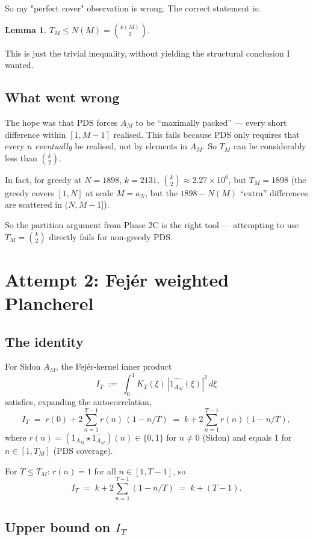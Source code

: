 \documentclass[11pt]{article}
\newtheorem{lemma}{Lemma}
\begin{document}
So my "perfect cover" observation is wrong. The correct statement is:

\begin{lemma}\label{lem:Tlow}
$T_M \leq N(M) = \binom{k(M)}{2}$.
\end{lemma}

This is just the trivial inequality, without yielding the structural
conclusion I wanted.

\subsection{What went wrong}

The hope was that PDS forces $A_M$ to be ``maximally packed'' --- every
short difference within $[1, M-1]$ realised. This fails because PDS only
requires that every $n$ \emph{eventually} be realised, not by elements
in $A_M$. So $T_M$ can be considerably less than $\binom{k}{2}$.

In fact, for greedy at $N = 1898$, $k = 2131$, $\binom{k}{2} \approx 2.27
\times 10^6$, but $T_M = 1898$ (the greedy covers $[1, N]$ at scale $M
= a_N$, but the $1898 - N(M)$ ``extra'' differences are scattered in
$(N, M-1]$).

So the partition argument from Phase 2C is the right tool ---
attempting to use $T_M = \binom{k}{2}$ directly fails for non-greedy
PDS.

\section{Attempt 2: Fej\'er weighted Plancherel}

\subsection{The identity}

For Sidon $A_M$, the Fej\'er-kernel inner product
\[
   I_T \;:=\; \int_0^1 K_T(\xi)\, |\widehat{1_{A_M}}(\xi)|^2\, d\xi
\]
satisfies, expanding the autocorrelation,
\[
   I_T \;=\; r(0) + 2 \sum_{n=1}^{T-1} r(n)\,(1 - n/T)
        \;=\; k + 2 \sum_{n=1}^{T-1} r(n)(1 - n/T),
\]
where $r(n) = (1_{A_M} \star 1_{A_M}^-)(n) \in \{0, 1\}$ for $n \neq 0$
(Sidon) and equals 1 for $n \in [1, T_M]$ (PDS coverage).

For $T \leq T_M$: $r(n) = 1$ for all $n \in [1, T-1]$, so
\[
   I_T \;=\; k + 2 \sum_{n=1}^{T-1}(1 - n/T) \;=\; k + (T - 1).
\]

\subsection{Upper bound on $I_T$}
\end{document}
